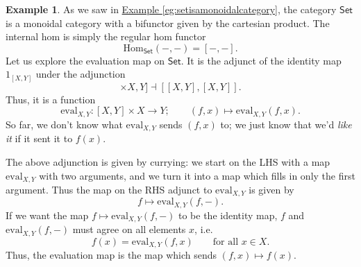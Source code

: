 \documentclass[a4paper]{report}
\newcommand{\Hom}{\mathrm{Hom}}
\newcommand{\ev}{\mathrm{eval}}
\theoremstyle{definition}
\newtheorem{example}{Example}[section]
\theoremstyle{plain}
\theoremstyle{remark}
\begin{document}
\begin{example}
  \label{eg:evaluationmapinset}
  As we saw in \hyperref[eg:setisamonoidalcategory]{Example \ref*{eg:setisamonoidalcategory}}, the category $\mathsf{Set}$ is a monoidal category with a bifunctor given by the cartesian product. The internal hom is simply the regular hom functor 
  \begin{equation*}
    \Hom_{\mathsf{Set}}(-,-) = [-,-].
  \end{equation*}
  Let us explore the evaluation map on $\mathsf{Set}$. It is the adjunct of the identity map $1_{[X, Y]}$ under the adjunction
  \begin{equation*}
    [[X, Y] \times X, Y] \dashv [[X, Y], [X, Y]].
  \end{equation*}
  Thus, it is a function 
  \begin{equation*}
    \ev_{X, Y}\colon [X, Y] \times X \to Y;\qquad (f, x) \mapsto \ev_{X, Y}(f, x).
  \end{equation*}
  So far, we don't know what $\ev_{X, Y}$ sends $(f, x)$ to; we just know that we'd \emph{like it} if it sent it to $f(x)$.

  The above adjunction is given by currying: we start on the LHS with a map $\ev_{X, Y}$ with two arguments, and we turn it into a map which fills in only the first argument. Thus the map on the RHS adjunct to $\ev_{X, Y}$ is given by 
  \begin{equation*}
    f \mapsto \ev_{X, Y}(f, -).
  \end{equation*}
  If we want the map $f \mapsto \ev_{X, Y}(f, -)$ to be the identity map, $f$ and $\ev_{X, Y}(f, -)$ must agree on all elements $x$, i.e.
  \begin{equation*}
    f(x) = \ev_{X, Y}(f, x)\qquad\text{for all }x \in X.
  \end{equation*}
  Thus, the evaluation map is the map which sends $(f, x) \mapsto f(x)$.
\end{example}
\end{document}
